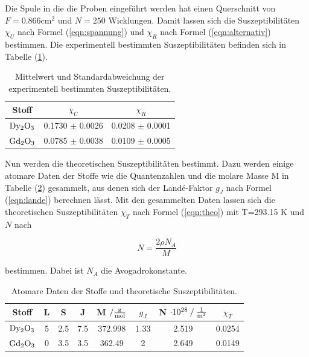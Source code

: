 \noindent 
Die Spule in die die Proben eingeführt werden hat einen Querschnitt von $F=0.866\si{\centi\meter\squared}$ und $N=250$ Wicklungen.
Damit lassen sich die Suszeptibilitäten $\chi_U$ nach Formel (\ref{eqn:spannung})
und $\chi_R$ nach Formel (\ref{eqn:alternativ})
bestimmen.
Die experimentell bestimmten Suszeptibilitäten befinden sich in Tabelle (\ref{tab:expsus}).

\begin{table}
    \centering
    \begin{tabular}{c c c}
        \toprule
        {Stoff} & {$\chi_U $} & {$\chi_R $} \\
    \midrule
    $\ce{Dy2O3}$ & 0.1730 $\pm$ 0.0026  &  0.0208 $\pm$ 0.0001 \\
    $\ce{Gd2O3}$ & 0.0785 $\pm$ 0.0038  & 0.0109  $\pm$ 0.0005 \\
    \bottomrule
\end{tabular}
\caption{Mittelwert und Standardabweichung der experimentell bestimmten Suszeptibilitäten.}
\label{tab:expsus}
\end{table}

\newpage
\noindent
Nun werden die theoretischen Suszeptibilitäten bestimmt.
Dazu werden einige atomare Daten der Stoffe wie die Quantenzahlen und die molare Masse M in Tabelle (\ref{tab:th1}) gesammelt, aus denen sich der Landé-Faktor $g_J$ nach Formel (\ref{eqn:lande})
berechnen lässt.
Mit den gesammelten Daten lassen sich die theoretischen Suszeptibilitäten $\chi_T$ nach Formel (\ref{eqn:theo}) mit T=293.15 K und $N$ nach 

\begin{equation}
N = \frac{2\rho N_A}{M}
\end{equation}

\noindent
bestimmen. 
Dabei ist $N_A$ die Avogadrokonstante.


\begin{table}
    \centering
    \begin{tabular}{c c c c c c c c}
        \toprule
        {Stoff} & {L} & {S} & {J} & {M $\mathbin{/} \si[per-mode=fraction]{\gram\per\mol}$ } & {$g_J$} & {N $\cdot 10^{28} \mathbin{/} \si[per-mode=fraction]{\per\cubic\meter} $} & {$\chi_T$} \\
    \midrule
    $\ce{Dy2O3}$ & 5 & 2.5 & 7.5 & 372.998 & 1.33 & 2.519 & 0.0254 \\
    $\ce{Gd2O3}$ & 0 & 3.5 & 3.5 & 362.49  & 2    & 2.649 & 0.0149 \\
    \bottomrule
\end{tabular}
\caption{Atomare Daten der Stoffe und theoretische Suszeptibilitäten.}
\label{tab:th1}
\end{table}